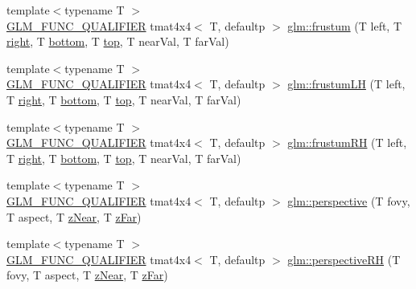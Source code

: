 \begin{DoxyCompactItemize}
\item 
{\footnotesize template$<$typename T $>$ }\\\mbox{\hyperlink{setup_8hpp_a33fdea6f91c5f834105f7415e2a64407}{G\+L\+M\+\_\+\+F\+U\+N\+C\+\_\+\+Q\+U\+A\+L\+I\+F\+I\+ER}} tmat4x4$<$ T, defaultp $>$ \mbox{\hyperlink{group__gtc__matrix__transform_gada6deb989d4b553fe0f7e3279f3afae1}{glm\+::frustum}} (T left, T \mbox{\hyperlink{glad_8h_ab412e67df941b4600c352b0b9e76d2ee}{right}}, T \mbox{\hyperlink{glad_8h_a8f1e84df0c183c8fd701618316c9e280}{bottom}}, T \mbox{\hyperlink{glad_8h_ae78295170773f8782029afc65913897a}{top}}, T near\+Val, T far\+Val)
\item 
{\footnotesize template$<$typename T $>$ }\\\mbox{\hyperlink{setup_8hpp_a33fdea6f91c5f834105f7415e2a64407}{G\+L\+M\+\_\+\+F\+U\+N\+C\+\_\+\+Q\+U\+A\+L\+I\+F\+I\+ER}} tmat4x4$<$ T, defaultp $>$ \mbox{\hyperlink{group__gtc__matrix__transform_ga75b1c1d0ee1f80c1e873605adeb1838c}{glm\+::frustum\+LH}} (T left, T \mbox{\hyperlink{glad_8h_ab412e67df941b4600c352b0b9e76d2ee}{right}}, T \mbox{\hyperlink{glad_8h_a8f1e84df0c183c8fd701618316c9e280}{bottom}}, T \mbox{\hyperlink{glad_8h_ae78295170773f8782029afc65913897a}{top}}, T near\+Val, T far\+Val)
\item 
{\footnotesize template$<$typename T $>$ }\\\mbox{\hyperlink{setup_8hpp_a33fdea6f91c5f834105f7415e2a64407}{G\+L\+M\+\_\+\+F\+U\+N\+C\+\_\+\+Q\+U\+A\+L\+I\+F\+I\+ER}} tmat4x4$<$ T, defaultp $>$ \mbox{\hyperlink{group__gtc__matrix__transform_gad0e184273bdacbe769e5cd81069e48ed}{glm\+::frustum\+RH}} (T left, T \mbox{\hyperlink{glad_8h_ab412e67df941b4600c352b0b9e76d2ee}{right}}, T \mbox{\hyperlink{glad_8h_a8f1e84df0c183c8fd701618316c9e280}{bottom}}, T \mbox{\hyperlink{glad_8h_ae78295170773f8782029afc65913897a}{top}}, T near\+Val, T far\+Val)
\item 
{\footnotesize template$<$typename T $>$ }\\\mbox{\hyperlink{setup_8hpp_a33fdea6f91c5f834105f7415e2a64407}{G\+L\+M\+\_\+\+F\+U\+N\+C\+\_\+\+Q\+U\+A\+L\+I\+F\+I\+ER}} tmat4x4$<$ T, defaultp $>$ \mbox{\hyperlink{group__gtc__matrix__transform_gac3613dcb6c6916465ad5b7ad5a786175}{glm\+::perspective}} (T fovy, T aspect, T \mbox{\hyperlink{glad_8h_a48b62672ab8e9fe8f51a25e62e7bc888}{z\+Near}}, T \mbox{\hyperlink{glad_8h_a7f9438456c002a9d045c5e4c3b6a9cbb}{z\+Far}})
\item 
{\footnotesize template$<$typename T $>$ }\\\mbox{\hyperlink{setup_8hpp_a33fdea6f91c5f834105f7415e2a64407}{G\+L\+M\+\_\+\+F\+U\+N\+C\+\_\+\+Q\+U\+A\+L\+I\+F\+I\+ER}} tmat4x4$<$ T, defaultp $>$ \mbox{\hyperlink{group__gtc__matrix__transform_ga5a4fa9f8ffabb2294e48a18bf8fa2f5f}{glm\+::perspective\+RH}} (T fovy, T aspect, T \mbox{\hyperlink{glad_8h_a48b62672ab8e9fe8f51a25e62e7bc888}{z\+Near}}, T \mbox{\hyperlink{glad_8h_a7f9438456c002a9d045c5e4c3b6a9cbb}{z\+Far}})

\end{DoxyCompactItemize}
